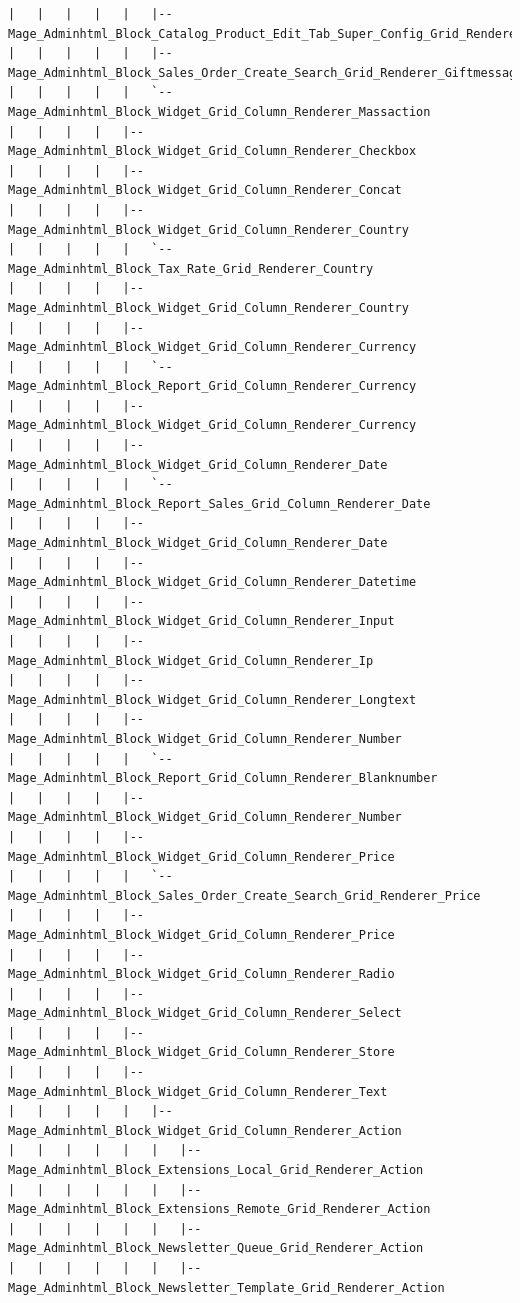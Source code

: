 \documentclass[oneside]{book}
\begin{document}
\begin{lstlisting}
|   |   |   |   |   |-- Mage_Adminhtml_Block_Catalog_Product_Edit_Tab_Super_Config_Grid_Renderer_Checkbox
|   |   |   |   |   |-- Mage_Adminhtml_Block_Sales_Order_Create_Search_Grid_Renderer_Giftmessage
|   |   |   |   |   `-- Mage_Adminhtml_Block_Widget_Grid_Column_Renderer_Massaction
|   |   |   |   |-- Mage_Adminhtml_Block_Widget_Grid_Column_Renderer_Checkbox
|   |   |   |   |-- Mage_Adminhtml_Block_Widget_Grid_Column_Renderer_Concat
|   |   |   |   |-- Mage_Adminhtml_Block_Widget_Grid_Column_Renderer_Country
|   |   |   |   |   `-- Mage_Adminhtml_Block_Tax_Rate_Grid_Renderer_Country
|   |   |   |   |-- Mage_Adminhtml_Block_Widget_Grid_Column_Renderer_Country
|   |   |   |   |-- Mage_Adminhtml_Block_Widget_Grid_Column_Renderer_Currency
|   |   |   |   |   `-- Mage_Adminhtml_Block_Report_Grid_Column_Renderer_Currency
|   |   |   |   |-- Mage_Adminhtml_Block_Widget_Grid_Column_Renderer_Currency
|   |   |   |   |-- Mage_Adminhtml_Block_Widget_Grid_Column_Renderer_Date
|   |   |   |   |   `-- Mage_Adminhtml_Block_Report_Sales_Grid_Column_Renderer_Date
|   |   |   |   |-- Mage_Adminhtml_Block_Widget_Grid_Column_Renderer_Date
|   |   |   |   |-- Mage_Adminhtml_Block_Widget_Grid_Column_Renderer_Datetime
|   |   |   |   |-- Mage_Adminhtml_Block_Widget_Grid_Column_Renderer_Input
|   |   |   |   |-- Mage_Adminhtml_Block_Widget_Grid_Column_Renderer_Ip
|   |   |   |   |-- Mage_Adminhtml_Block_Widget_Grid_Column_Renderer_Longtext
|   |   |   |   |-- Mage_Adminhtml_Block_Widget_Grid_Column_Renderer_Number
|   |   |   |   |   `-- Mage_Adminhtml_Block_Report_Grid_Column_Renderer_Blanknumber
|   |   |   |   |-- Mage_Adminhtml_Block_Widget_Grid_Column_Renderer_Number
|   |   |   |   |-- Mage_Adminhtml_Block_Widget_Grid_Column_Renderer_Price
|   |   |   |   |   `-- Mage_Adminhtml_Block_Sales_Order_Create_Search_Grid_Renderer_Price
|   |   |   |   |-- Mage_Adminhtml_Block_Widget_Grid_Column_Renderer_Price
|   |   |   |   |-- Mage_Adminhtml_Block_Widget_Grid_Column_Renderer_Radio
|   |   |   |   |-- Mage_Adminhtml_Block_Widget_Grid_Column_Renderer_Select
|   |   |   |   |-- Mage_Adminhtml_Block_Widget_Grid_Column_Renderer_Store
|   |   |   |   |-- Mage_Adminhtml_Block_Widget_Grid_Column_Renderer_Text
|   |   |   |   |   |-- Mage_Adminhtml_Block_Widget_Grid_Column_Renderer_Action
|   |   |   |   |   |   |-- Mage_Adminhtml_Block_Extensions_Local_Grid_Renderer_Action
|   |   |   |   |   |   |-- Mage_Adminhtml_Block_Extensions_Remote_Grid_Renderer_Action
|   |   |   |   |   |   |-- Mage_Adminhtml_Block_Newsletter_Queue_Grid_Renderer_Action
|   |   |   |   |   |   |-- Mage_Adminhtml_Block_Newsletter_Template_Grid_Renderer_Action

\end{lstlisting}
\end{document}
